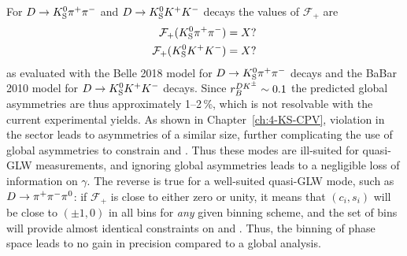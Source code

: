 For ${{D}\rightarrow{\ensuremath{{K}^0_{\mathrm{S}}}}{\ensuremath{{\pi}^+}}{\ensuremath{{\pi}^-}}}$ and ${D}\rightarrow{\ensuremath{{K}^0_{\mathrm{S}}}}{\ensuremath{{K}^+}}{\ensuremath{{K}^-}}$ decays the values of $\mathcal F_+$ are
\begin{align}
\begin{split}
    \mathcal F_+({{K}^0_{\mathrm{S}}}{{\pi}^+}{{\pi}^-}) = X? \\
    \mathcal F_+({{K}^0_{\mathrm{S}}}{{K}^+}{{K}^-}) = X?
\end{split}
\end{align}
as evaluated with the Belle 2018 model for ${{D}\rightarrow{\ensuremath{{K}^0_{\mathrm{S}}}}{\ensuremath{{\pi}^+}}{\ensuremath{{\pi}^-}}}$ decays and the BaBar 2010 model for ${D}\rightarrow{\ensuremath{{K}^0_{\mathrm{S}}}}{\ensuremath{{K}^+}}{\ensuremath{{K}^-}}$ decays. Since $r_B^{{{D}{{K}^\pm}}}\sim 0.1$ the predicted global asymmetries are thus approximately 1--2\,\%, which is not resolvable with the current experimental yields. As shown in Chapter~\ref{ch:4-KS-CPV}, \CP violation in the \KS sector leads to asymmetries of a similar size, further complicating the use of global asymmetries to constrain \xpm and \ypm. Thus these modes are ill-suited for quasi-GLW measurements, and ignoring global asymmetries leads to a negligible loss of information on $\gamma$. The reverse is true for a well-suited quasi-GLW mode, such as ${D}\rightarrow{\ensuremath{{\pi}^+}}{\ensuremath{{\pi}^-}}{\ensuremath{{\pi}^0}}$: if $\mathcal F_+$ is close to either zero or unity, it means that $(c_i, s_i)$ will be close to $(\pm1, 0)$ in all bins for \emph{any} given binning scheme, and the set of bins will provide almost identical constraints on \xpm and \ypm. Thus, the binning of phase space leads to no gain in precision compared to a global analysis.


